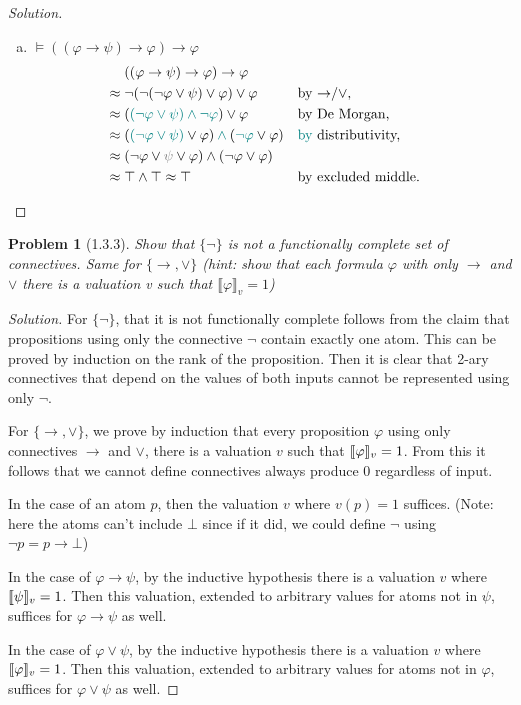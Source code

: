 \documentclass[letter]{article}
\newtheorem{problem}{Problem}
\theoremstyle{definition}
\newenvironment{solution}
{\begin{proof}[Solution]}
        {\end{proof}}
\renewcommand{\phi}{\varphi}
\begin{document}
\begin{solution}
\begin{enumerate}[(a)]
  \item $\models ((\phi \to \psi) \to \phi) \to \phi$
\begin{align*}
  & ((\phi \to \psi) \to \phi) \to \phi &
\\ \approx{}
  & \neg (\neg (\neg \phi \lor \psi) \lor \phi) \lor \phi
  && \text{by \tolor,}
\\ \approx{}
  & ({\color{teal}(\neg \phi \lor \psi) \land \neg \phi}) \lor \phi
  && \text{by De Morgan,}
\\ \approx{}
  & ({\color{teal}(\neg \phi \lor \psi)} \lor \phi) \colop{teal}{\land} ({\color{teal}\neg \phi} \lor \phi)
  && \text{{\color{teal}by} distributivity,}
\\ \approx{}
  & (\neg \phi \lor {\color{gray}\psi} \lor \phi) \land (\neg \phi \lor \phi)
  &&
\\ \approx{}
  & \top \land \top \approx \top
  && \text{by excluded middle.}
\end{align*}
\end{enumerate}
\end{solution}

\begin{problem}[1.3.3] Show that $\{ \neg \}$ is not a functionally complete set of connectives. Same for $\{\to, \lor\}$ (hint: show that each formula $\phi$ with only $\to$ and $\lor$ there is a valuation v such that $\llbracket \phi \rrbracket_v = 1$)
\end{problem}
\begin{solution}
  For $\{ \neg \}$, that it is not functionally complete follows from the claim that propositions using only the connective $\neg$ contain exactly one atom. This can be proved by induction on the rank of the proposition. Then it is clear that 2-ary connectives that depend on the values of both inputs cannot be represented using only $\neg$.

  For $\{\to, \lor\}$, we prove by induction that every proposition $\phi$ using only connectives $\to$ and $\lor$, there is a valuation $v$ such that $\den{\phi} = 1$. From this it follows that we cannot define connectives always produce 0 regardless of input.

  In the case of an atom $p$, then the valuation $v$ where $v(p) = 1$ suffices. (Note: here the atoms can't include $\bot$ since if it did, we could define $\neg$ using $\neg p = p \to \bot$)

  In the case of $\phi \to \psi$, by the inductive hypothesis there is a valuation $v$ where $\llbracket \psi \rrbracket_v = 1$. Then this valuation, extended to arbitrary values for atoms not in $\psi$, suffices for $\phi \to \psi$ as well.

  In the case of $\phi \lor \psi$, by the inductive hypothesis there is a valuation $v$ where $\den{\phi} = 1$. Then this valuation, extended to arbitrary values for atoms not in $\phi$, suffices for $\phi \lor \psi$ as well.
\end{solution}
\end{document}
